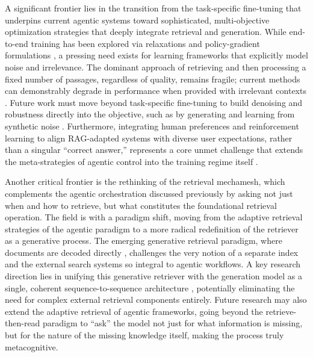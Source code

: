 \documentclass[11pt,a4paper]{article}
\begin{document}
A significant frontier lies in the transition from the task-specific fine-tuning that underpins current agentic systems toward sophisticated, multi-objective optimization strategies that deeply integrate retrieval and generation. While end-to-end training has been explored via relaxations and policy-gradient formulations \cite{arxiv:2405.02816v1}, a pressing need exists for learning frameworks that explicitly model noise and irrelevance. The dominant approach of retrieving and then processing a fixed number of passages, regardless of quality, remains fragile; current methods can demonstrably degrade in performance when provided with irrelevant contexts \cite{arxiv:2310.01558v1}. Future work must move beyond task-specific fine-tuning to build denoising and robustness directly into the objective, such as by generating and learning from synthetic noise \cite{arxiv:2310.01558v1}. Furthermore, integrating human preferences and reinforcement learning to align RAG-adapted systems with diverse user expectations, rather than a singular ``correct answer,'' represents a core unmet challenge that extends the meta-strategies of agentic control into the training regime itself \cite{arxiv:2401.06954v2}.

Another critical frontier is the rethinking of the retrieval mechamesh, which complements the agentic orchestration discussed previously by asking not just when and how to retrieve, but what constitutes the foundational retrieval operation. The field is with a paradigm shift, moving from the adaptive retrieval strategies of the agentic paradigm to a more radical redefinition of the retriever as a generative process. The emerging generative retrieval paradigm, where documents are decoded directly \cite{arxiv:2404.14851v3,arxiv:2404.14851v3}, challenges the very notion of a separate index and the external search systems so integral to agentic workflows. A key research direction lies in unifying this generative retriever with the generation model as a single, coherent sequence-to-sequence architecture \cite{arxiv:2402.01176v2}, potentially eliminating the need for complex external retrieval components entirely. Future research may also extend the adaptive retrieval of agentic frameworks, going beyond the retrieve-then-read paradigm to ``ask'' the model not just for what information is missing, but for the nature of the missing knowledge itself, making the process truly metacognitive.
\end{document}
